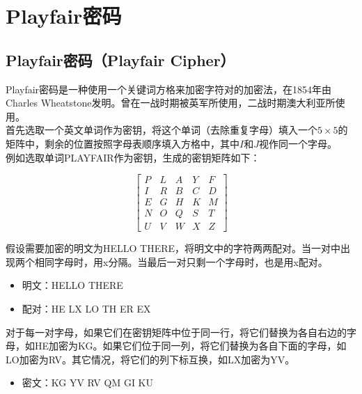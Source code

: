 \newpage

\section{Playfair密码}

\subsection{Playfair密码（Playfair Cipher）}

Playfair密码是一种使用一个关键词方格来加密字符对的加密法，在1854年由Charles Wheatstone发明。曾在一战时期被英军所使用，二战时期澳大利亚所使用。\\

首先选取一个英文单词作为密钥，将这个单词（去除重复字母）填入一个$ 5 \times 5 $的矩阵中，剩余的位置按照字母表顺序填入方格中，其中$ I $和$ J $视作同一个字母。\\

例如选取单词PLAYFAIR作为密钥，生成的密钥矩阵如下：

\[
    \begin{bmatrix}
        P & L & A & Y & F \\
        I & R & B & C & D \\
        E & G & H & K & M \\
        N & O & Q & S & T \\
        U & V & W & X & Z
    \end{bmatrix}
\]

\vspace{0.5cm}

假设需要加密的明文为HELLO THERE，将明文中的字符两两配对。当一对中出现两个相同字母时，用x分隔。当最后一对只剩一个字母时，也是用x配对。

\begin{itemize}
    \item 明文：HELLO THERE
    \item 配对：HE LX LO TH ER EX
\end{itemize}

对于每一对字母，如果它们在密钥矩阵中位于同一行，将它们替换为各自右边的字母，如HE加密为KG。如果它们位于同一列，将它们替换为各自下面的字母，如LO加密为RV。其它情况，将它们的列下标互换，如LX加密为YV。

\begin{itemize}
    \item 密文：KG YV RV QM GI KU
\end{itemize}

\vspace{0.5cm}

